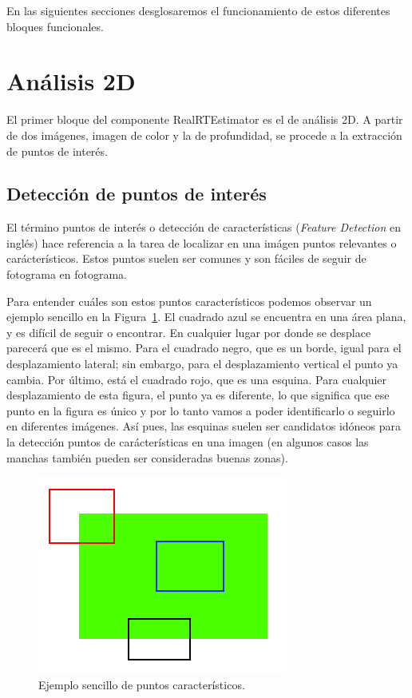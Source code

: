 En las siguientes secciones desglosaremos el funcionamiento de estos diferentes bloques funcionales.

\section{Análisis 2D}

El primer bloque del componente RealRTEstimator es el de análisis 2D. A partir de dos imágenes, imagen de color y la de profundidad, se procede a la extracción de puntos de interés.

\subsection{Detección de puntos de interés}

El término puntos de interés o detección de características (\textit{Feature Detection} en inglés) hace referencia a la tarea de localizar en una imágen puntos relevantes o carácterísticos. Estos puntos suelen ser comunes y son fáciles de seguir de fotograma en fotograma.

Para entender cuáles son estos puntos característicos podemos observar un ejemplo sencillo en la Figura~\ref{fig:feature_simple}. El cuadrado azul se encuentra en una área plana, y es difícil de seguir o encontrar. En cualquier lugar por donde se desplace parecerá que es el mismo. Para el cuadrado negro, que es un borde, igual para el desplazamiento lateral; sin embargo, para el desplazamiento vertical el punto ya cambia. Por último, está el cuadrado rojo, que es una esquina. Para cualquier desplazamiento de esta figura, el punto ya es diferente, lo que significa que ese punto en la figura es único y por lo tanto vamos a poder identificarlo o seguirlo en diferentes imágenes. Así pues, las esquinas suelen ser candidatos idóneos para la detección puntos de carácterísticas en una imagen (en algunos casos las manchas también pueden ser consideradas buenas zonas).

\begin{figure}[!ht]
\centering
\includegraphics[scale=0.7]{Figures/feature_simple.png}
\decoRule
\caption[Ejemplo de puntos de interés]{Ejemplo sencillo de puntos característicos.}
\label{fig:feature_simple}
\end{figure}

